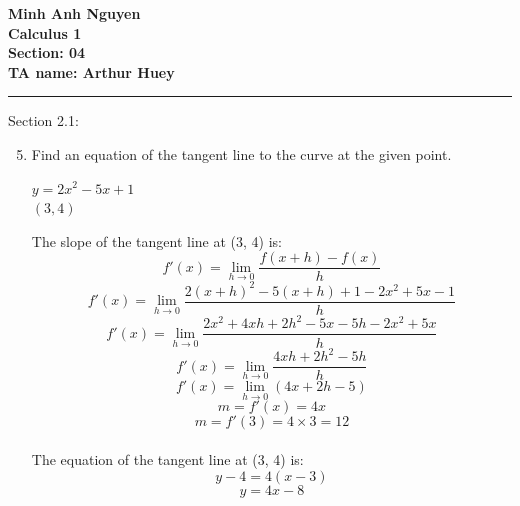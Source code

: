 \documentclass[12pt]{article}
\begin{document}
\textbf{Minh Anh Nguyen }\\
\textbf{Calculus 1\hfill }\\
\textbf{Section: 04}\\
\textbf{TA name: Arthur Huey}\\
\noindent\rule{16cm}{0.4pt}

Section 2.1:

\begin{enumerate}
    \setcounter{enumi}{4}

    \item Find an equation of the tangent line to the curve at the given point.
          \begin{center}
              $y = 2x^2 - 5x + 1$\\
              $(3,4)$
          \end{center}
          The slope of the tangent line at (3, 4) is:
          \[ f'(x) = {\displaystyle\lim_{h \to 0} \frac{f(x+h) - f(x)}{h}} \]
          \[ f'(x) = {\displaystyle\lim_{h \to 0} \frac{2(x+h)^2 - 5(x+h) + 1 - 2x^2 + 5x - 1}{h}} \]
          \[ f'(x) = {\displaystyle\lim_{h \to 0} \frac{2x^2 + 4xh + 2h^2 - 5x - 5h - 2x^2 + 5x}{h}} \]
          \[ f'(x) = {\displaystyle\lim_{h \to 0} \frac{4xh + 2h^2 - 5h}{h}} \]
          \[ f'(x) = {\displaystyle\lim_{h \to 0} (4x + 2h - 5)} \]
          \[ m = f'(x) = {\displaystyle 4x} \]
          \[ m = f'(3) = {\displaystyle 4 \times 3} = 12 \]\\
          The equation of the tangent line at (3, 4) is:
          \[y - 4 = 4(x-3)\]
          \[\boxed{y = 4x - 8}\]

\end{enumerate}

\newpage
\end{document}
